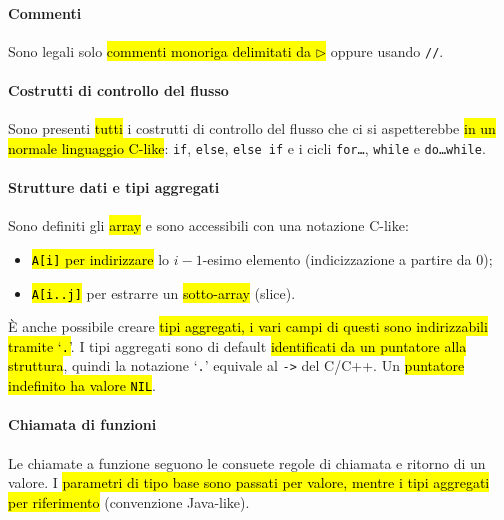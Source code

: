 \documentclass[a4paper,11pt,twoside]{article}
\theoremstyle{plain}
\theoremstyle{definition}
\theoremstyle{remark}
\newcommand{\pcom}{$\triangleright$}
\begin{document}
\paragraph{Commenti} Sono legali solo \hl{commenti monoriga delimitati da
\pcom{}} oppure usando \texttt{//}.

\paragraph{Costrutti di controllo del flusso} Sono presenti \hl{tutti} i
costrutti di controllo del flusso che ci si aspetterebbe \hl{in un normale
linguaggio C-like}: \texttt{if}, \texttt{else}, \texttt{else if} e i cicli
\texttt{for\dots}, \texttt{while} e \texttt{do\dots while}.

\paragraph{Strutture dati e tipi aggregati} Sono definiti gli \hl{array} e sono
accessibili con una notazione C-like:

\begin{itemize}
  \item \hl{\texttt{A[i]} per indirizzare} lo $i-1$-esimo elemento
    (indicizzazione a partire da 0);
  \item \hl{\texttt{A[i..j]}} per estrarre un \hl{sotto-array} (slice).
\end{itemize}

\noindent È anche possibile creare \hl{tipi aggregati, i vari campi di questi
sono indirizzabili tramite `\texttt{.}'}. I tipi aggregati sono di default
\hl{identificati da un puntatore alla struttura}, quindi la notazione
`\texttt{.}' equivale al \texttt{->} del C/C++. Un \hl{puntatore indefinito ha
valore \texttt{NIL}}.

\paragraph{Chiamata di funzioni} Le chiamate a funzione seguono le consuete
regole di chiamata e ritorno di un valore. I \hl{parametri di tipo base sono
passati per valore, mentre i tipi aggregati per riferimento} (convenzione
Java-like).
\end{document}
